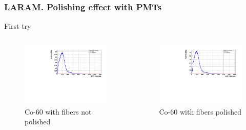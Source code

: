 \documentclass{beamer}
\begin{document}
\begin{frame}
\frametitle{LARAM. Polishing effect with PMTs}
First try\\

\begin{columns}

\begin{figure}[hbtp]
\centering
\includegraphics[scale=0.3]{LARAM/Polishing_effect/First_try/No_polished/Co_60_background.pdf}
\caption{Co-60 with fibers not polished}
\end{figure}


\begin{figure}[hbtp]
\centering
\includegraphics[scale=0.3]{LARAM/Polishing_effect/First_try/Polished/Co_60_background.pdf}
\caption{Co-60 with fibers polished}
\end{figure}

\end{columns}

\end{frame}
\end{document}
